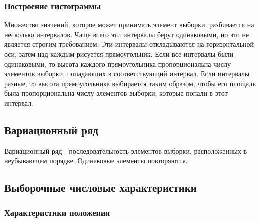 \subsubsection{Построение гистограммы}

Множество значений, которое может принимать элемент выборки, разбивается на несколько интервалов. Чаще всего эти интервалы берут одинаковыми, но это не является строгим требованием. Эти интервалы откладываются на горизонтальной оси, затем над каждым рисуется прямоугольник. Если все интервалы были одинаковыми, то высота каждого прямоугольника пропорциональна числу элементов выборки, попадающих в соответствующий интервал. Если интервалы разные, то высота прямоугольника выбирается таким образом, чтобы его площадь была пропорциональна числу элементов выборки, которые попали в этот интервал. \cite{s:hist}

\subsection{Вариационный ряд}

Вариационный ряд - последовательность элементов выборки, расположенных в неубывающем порядке. Одинаковые элементы повторяются. \cite[с. 409]{b:probSectMath}

\subsection{Выборочные числовые характеристики}

\subsubsection{Характеристики положения}

